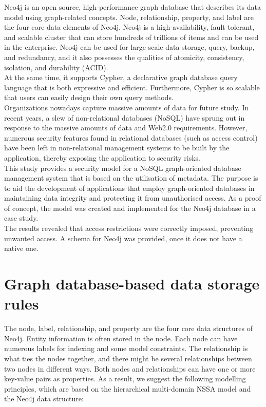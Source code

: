 \documentclass[paper=a4, fontsize=11pt]{scrartcl}
\numberwithin{equation}{section}		%
\numberwithin{figure}{section}			%
\numberwithin{table}{section}				%
\begin{document}
Neo4j is an open source, high-performance graph database that describes its data model using graph-related concepts. Node, relationship, property, and label are the four core data elements of Neo4j. Neo4j is a high-availability, fault-tolerant, and scalable cluster that can store hundreds of trillions of items and can be used in the enterprise. Neo4j can be used for large-scale data storage, query, backup, and redundancy, and it also possesses the qualities of atomicity, consistency, isolation, and durability (ACID). 
\\
At the same time, it supports Cypher, a declarative graph database query language that is both expressive and efficient. Furthermore, Cypher is so scalable that users can easily design their own query methods.
\\
Organizations nowadays capture massive amounts of data for future study. In recent years, a slew of non-relational databases (NoSQL) have sprung out in response to the massive amounts of data and Web2.0 requirements. However, numerous security features found in relational databases (such as access control) have been left in non-relational management systems to be built by the application, thereby exposing the application to security risks. 
\\
This study provides a security model for a NoSQL graph-oriented database management system that is based on the utilisation of metadata. The purpose is to aid the development of applications that employ graph-oriented databases in maintaining data integrity and protecting it from unauthorised access. As a proof of concept, the model was created and implemented for the Neo4j database in a case study.
\\
The results revealed that access restrictions were correctly imposed, preventing unwanted access. A schema for Neo4j was provided, once it does not have a native one.
\section{Graph database-based data storage rules}
The node, label, relationship, and property are the four core data structures of Neo4j. Entity information is often stored in the node. Each node can have numerous labels for indexing and some model constraints. The relationship is what ties the nodes together, and there might be several relationships between two nodes in different ways. Both nodes and relationships can have one or more key-value pairs as properties. As a result, we suggest the following modelling principles, which are based on the hierarchical multi-domain NSSA model and the Neo4j data structure:
\end{document}
